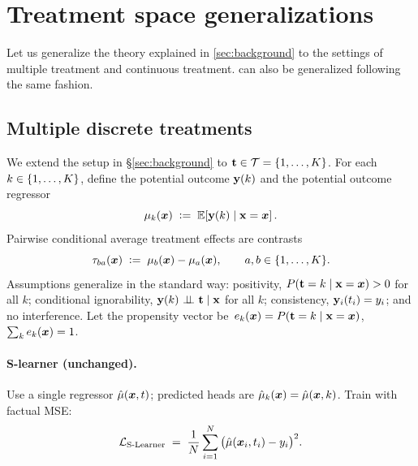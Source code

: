 \section{Treatment space generalizations}
\label{app:treatments}

Let us generalize the theory explained in \cref{sec:background} to the settings of multiple treatment and continuous treatment. \Ours can also be generalized following the same fashion.

\subsection{Multiple discrete treatments}
\label{sec:app:multitreatment}
We extend the setup in \S\ref{sec:background} to ${\mathbf{t}} \in \mathcal{T}=\{1,\dots,K\}$. For each $k\in\{1,\dots,K\}$, define the potential outcome ${\mathbf{y}}(k)$ and the potential outcome regressor
\begin{equation}
\mu_k({\bm{x}})\;\vcentcolon=\;\operatorname{\mathbb{E}}\!\left[{\mathbf{y}}(k)\mid {\mathbf{x}}={\bm{x}}\right].
\end{equation}
Pairwise conditional average treatment effects are contrasts
\begin{equation}
\label{eq:cate-multi}
\tau_{ba}{({\bm{x}})}\;\vcentcolon=\;\mu_b({\bm{x}})-\mu_a({\bm{x}}),\qquad a,b\in\{1,\dots,K\}.
\end{equation}
Assumptions generalize in the standard way: \itemi positivity, $P({\mathbf{t}}=k\mid {\mathbf{x}}={\bm{x}})>0$ for all $k$; \itemii conditional ignorability, $\outcome(k)\,\indep\,\giventhat{\treatment}{\covariates}$ for all $k$; \itemiii consistency, ${\mathbf{y}}_i(t_i)=y_i$; and \itemiv no interference. Let the propensity vector be $\,e_k({\bm{x}})=P({\mathbf{t}}=k\mid {\mathbf{x}}={\bm{x}})$, $\sum_{k}e_k({\bm{x}})=1$.

\paragraph{S-learner (unchanged).}
Use a single regressor $\hat{\mu}({\bm{x}},t)$; predicted heads are $\hat{\mu}_k({\bm{x}})=\hat{\mu}({\bm{x}},k)$. Train with factual MSE:
\begin{equation}
\label{eq:S-multi}
\mathcal{L}_{\text{S-Learner}}\;=\;\frac{1}{N}\sum_{i=1}^{N}\big(\hat{\mu}({\bm{x}}_i,t_i)-y_i\big)^2.
\end{equation}

